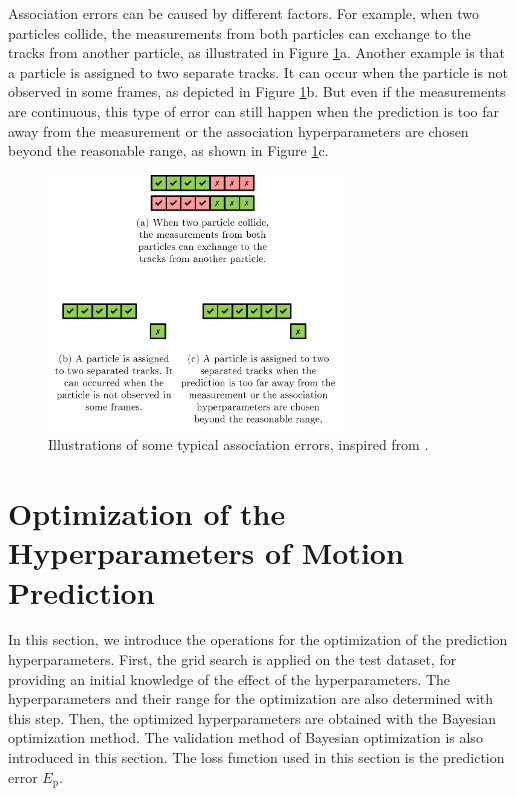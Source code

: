 Association errors can be caused by different factors. For example, when two particles collide, the measurements from both particles can exchange to the tracks from another particle, as illustrated in Figure \ref{asso err2}a. Another example is that a particle is assigned to two separate tracks. It can occur when the particle is not observed in some frames, as depicted in Figure \ref{asso err2}b. But even if the measurements are continuous, this type of error can still happen when the prediction is too far away from the measurement or the association hyperparameters are chosen beyond the reasonable range, as shown in Figure \ref{asso err2}c. 

\begin{figure}[htbp]
\centering
\includegraphics[width=0.7\textwidth]{figures/Asso/association error2.png}
\caption{Illustrations of some typical association errors, inspired from \cite{pfaff2019multitarget}.}
\label{asso err2}
\end{figure}

\section{Optimization of the Hyperparameters of Motion Prediction}  


In this section, we introduce the operations for the optimization of the prediction hyperparameters. First, the grid search is applied on the test dataset, for providing an initial knowledge of the effect of the hyperparameters. The hyperparameters and their range for the optimization are also determined with this step. Then, the optimized hyperparameters are obtained with the Bayesian optimization method. The validation method of Bayesian optimization is also introduced in this section. The loss function used in this section is the prediction error $E_{\mathrm{p}}$.

